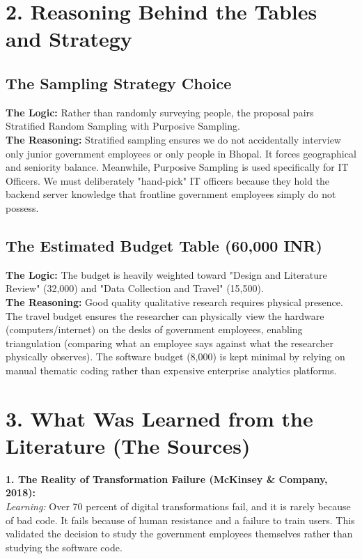 \documentclass[11pt,a4paper]{article}
\begin{document}
\vspace{0.5cm}

\section*{2. Reasoning Behind the Tables and Strategy}

\subsection*{The Sampling Strategy Choice}
\textbf{The Logic:} Rather than randomly surveying people, the proposal pairs Stratified Random Sampling with Purposive Sampling. \\
\textbf{The Reasoning:} Stratified sampling ensures we do not accidentally interview only junior government employees or only people in Bhopal. It forces geographical and seniority balance. Meanwhile, Purposive Sampling is used specifically for IT Officers. We must deliberately "hand-pick" IT officers because they hold the backend server knowledge that frontline government employees simply do not possess. 

\subsection*{The Estimated Budget Table (60,000 INR)}
\textbf{The Logic:} The budget is heavily weighted toward "Design and Literature Review" (32,000) and "Data Collection and Travel" (15,500). \\
\textbf{The Reasoning:} Good quality qualitative research requires physical presence. The travel budget ensures the researcher can physically view the hardware (computers/internet) on the desks of government employees, enabling triangulation (comparing what an employee says against what the researcher physically observes). The software budget (8,000) is kept minimal by relying on manual thematic coding rather than expensive enterprise analytics platforms.

\vspace{0.5cm}

\section*{3. What Was Learned from the Literature (The Sources)}

\textbf{1. The Reality of Transformation Failure (McKinsey \& Company, 2018):} \\
\textit{Learning:} Over 70 percent of digital transformations fail, and it is rarely because of bad code. It fails because of human resistance and a failure to train users. This validated the decision to study the government employees themselves rather than studying the software code.
\end{document}
